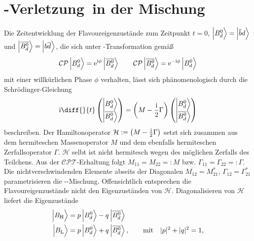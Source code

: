 \section[\CP-Verletzung in der Mischung]{\boldmath\CP-Verletzung\ \unboldmath in der Mischung}
Die Zeitentwicklung der Flavoureigenzustände zum Zeitpunkt $t=0$, $\Ket{\text{\Bd}\vphantom{\text{\Bdbar}}} = \Ket{\overline{b}d\vphantom{\text{\Bdbar}}}$ und $\Ket{\text{\Bdbar}} = \Ket{b\overline{d}\vphantom{\text{\Bdbar}}}$, die sich unter \CP-Transformation gemäß
\begin{align}
\text{\CP}\Ket{\text{\Bd}\vphantom{\text{\Bdbar}}} = \e^{\im\phi}\Ket{\text{\Bdbar}} \qquad \text{\CP}\Ket{\text{\Bdbar}} = \e^{-\im\phi}\Ket{\text{\Bd}\vphantom{\text{\Bdbar}}}
\end{align} 
mit einer willkürlichen Phase $\phi$ verhalten, lässt sich phänomenologisch durch die Schrödinger-Gleichung
\begin{align}
\im \diff{}{t}\begin{pmatrix} \Ket{\text{\Bd}\vphantom{\text{\Bdbar}}} \\ \Ket{\text{\Bdbar}} \end{pmatrix} = \left(M - \frac{\im}{2} \Gamma\right) \begin{pmatrix} \Ket{\text{\Bd}\vphantom{\text{\Bdbar}}} \\ \Ket{\text{\Bdbar}} \end{pmatrix}
\end{align}
beschreiben. Der Hamiltonoperator $\mathcal{H}:=\left(M - \frac{\mathrm{i}}{2} \Gamma\right)$ setzt sich zusammen aus dem hermiteschen Massenoperator $M$ und dem ebenfalls hermiteschen Zerfallsoperator $\Gamma$. $\mathcal{H}$ selbt ist nicht hermitesch wegen des möglichen Zerfalls des Teilchens. Aus der $\mathcal{CPT}$-Erhaltung folgt $M_{11}=M_{22}=:M$ bzw. $\Gamma_{11}=\Gamma_{22}=:\Gamma$. Die nichtverschwindenden Elemente abseits der Diagonalen $M_{12}=M_{21}^*$, $\Gamma_{12}=\Gamma_{21}^*$ parametrisieren die \Bd-\Bdbar-Mischung. Offensichtlich entsprechen die Flavoureigenzustände nicht den Eigenzuständen von $\mathcal{H}$. Diagonalisieren von $\mathcal{H}$ liefert die Eigenzustände
\begin{align}
\Ket{B_{\text{H}}\vphantom{\text{\Bdbar}}} &= p \Ket{\text{\Bd}\vphantom{\text{\Bdbar}}} - q \Ket{\text{\Bdbar}} \label{eq:b_heavy}\\ 
\Ket{B_{\text{L}}\vphantom{\text{\Bdbar}}} &= p \Ket{\text{\Bd}\vphantom{\text{\Bdbar}}} + q \Ket{\text{\Bdbar}}, \qquad \text{mit} \quad |p|^2 + |q|^2 = 1, \label{eq:b_light}
\end{align}
